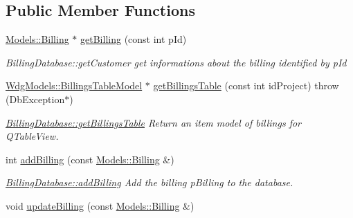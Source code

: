 \subsection*{Public Member Functions}
\begin{DoxyCompactItemize}
\item 
\hyperlink{classModels_1_1Billing}{Models\+::\+Billing} $\ast$ \hyperlink{classDatabases_1_1BillingDatabase_a835d4ca35a046fe1d0b336a1b8cf8f85}{get\+Billing} (const int p\+Id)
\begin{DoxyCompactList}\small\item\em Billing\+Database\+::get\+Customer get informations about the billing identified by {\itshape p\+Id} \end{DoxyCompactList}\item 
\hyperlink{classGui_1_1Widgets_1_1WdgModels_1_1BillingsTableModel}{Wdg\+Models\+::\+Billings\+Table\+Model} $\ast$ \hyperlink{classDatabases_1_1BillingDatabase_ade754e6aa116aa75606cf24474631322}{get\+Billings\+Table} (const int id\+Project)  throw (\+Db\+Exception$\ast$)
\begin{DoxyCompactList}\small\item\em \hyperlink{classDatabases_1_1BillingDatabase_ade754e6aa116aa75606cf24474631322}{Billing\+Database\+::get\+Billings\+Table} Return an item model of billings for Q\+Table\+View. \end{DoxyCompactList}\item 
int \hyperlink{classDatabases_1_1BillingDatabase_a656c622366884194a6823b679d7d2f63}{add\+Billing} (const \hyperlink{classModels_1_1Billing}{Models\+::\+Billing} \&)
\begin{DoxyCompactList}\small\item\em \hyperlink{classDatabases_1_1BillingDatabase_a656c622366884194a6823b679d7d2f63}{Billing\+Database\+::add\+Billing} Add the billing {\itshape p\+Billing} to the database. \end{DoxyCompactList}\item 
\hypertarget{classDatabases_1_1BillingDatabase_a74643c7e242cfe6fc294985984d6a65f}{}void \hyperlink{classDatabases_1_1BillingDatabase_a74643c7e242cfe6fc294985984d6a65f}{update\+Billing} (const \hyperlink{classModels_1_1Billing}{Models\+::\+Billing} \&)\label{classDatabases_1_1BillingDatabase_a74643c7e242cfe6fc294985984d6a65f}


\end{DoxyCompactItemize}
